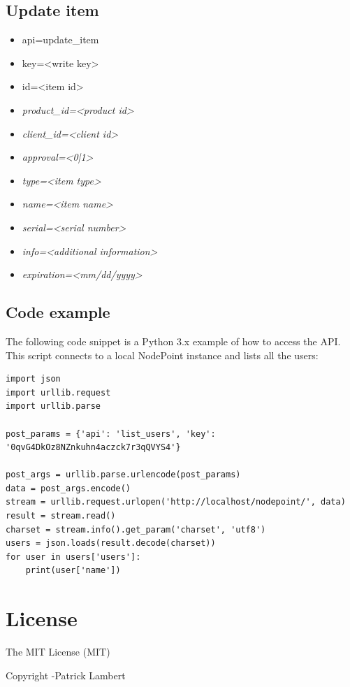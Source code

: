 \documentclass[11pt]{article}
\begin{document}
\subsection{Update item}

\begin{itemize}
\item api=update\_item
\item key=<write key>
\item id=<item id>
\item \textit{product\_id=<product id>}
\item \textit{client\_id=<client id>}
\item \textit{approval=<0|1>}
\item \textit{type=<item type>}
\item \textit{name=<item name>}
\item \textit{serial=<serial number>}
\item \textit{info=<additional information>}
\item \textit{expiration=<mm/dd/yyyy>}
\end{itemize}

\subsection{Code example}
The following code snippet is a Python 3.x example of how to access the API. This script connects to a local NodePoint instance and lists all the users:

\begin{lstlisting}
import json
import urllib.request
import urllib.parse

post_params = {'api': 'list_users', 'key': '0qvG4DkOz8NZnkuhn4aczck7r3qQVYS4'}

post_args = urllib.parse.urlencode(post_params)
data = post_args.encode()
stream = urllib.request.urlopen('http://localhost/nodepoint/', data)
result = stream.read()
charset = stream.info().get_param('charset', 'utf8')
users = json.loads(result.decode(charset))
for user in users['users']:
    print(user['name'])
\end{lstlisting}

\clearpage
\section{License}
The MIT License (MIT)

Copyright \textcopyright {}-\the\year \thinspace Patrick Lambert
\end{document}
